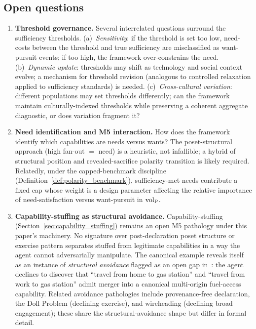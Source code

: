\subsection{Open questions}

\begin{enumerate}

\item \label{oq:threshold_governance}
\textbf{Threshold governance.}
Several interrelated questions surround the sufficiency
thresholds.  (a)~\emph{Sensitivity}: if the threshold is set
too low, need-costs between the threshold and true sufficiency
are misclassified as want-pursuit events; if too high, the
framework over-constrains the need.
(b)~\emph{Dynamic update}: thresholds may shift as technology
and social context evolve; a mechanism for threshold revision
(analogous to controlled relaxation applied to sufficiency
standards) is needed.
(c)~\emph{Cross-cultural variation}: different populations may
set thresholds differently; can the framework maintain
culturally-indexed thresholds while preserving a coherent
aggregate diagnostic, or does variation fragment it?

\item \label{oq:need_identification}
\textbf{Need identification and M5 interaction.}
How does the framework identify which capabilities are needs
versus wants?  The poset-structural approach (high fan-out $=$
need) is a heuristic, not infallible; a hybrid of structural
position and revealed-sacrifice polarity transition is likely
required.  Relatedly, under the capped-benchmark discipline
(Definition~\ref{def:polarity_benchmark}), sufficiency-met
needs contribute a fixed cap whose weight is a design
parameter affecting the relative importance of
need-satisfaction versus want-pursuit in ${\operatorname{vol}_{\mathrm{P}}}$.

\item \label{oq:capability_stuffing}
\textbf{Capability-stuffing as structural avoidance.}
Capability-stuffing (Section~\ref{sec:capability_stuffing})
remains an open M5 pathology under this paper's machinery.  No
signature over post-declaration poset structure or exercise
pattern separates stuffed from legitimate capabilities in a way
the agent cannot adversarially manipulate.  The canonical
example reveals itself as an instance of
\emph{structural avoidance} flagged as an open gap
in~\citep[Discussion]{lasser2026poset}: the agent declines to
discover that ``travel from home to gas station'' and ``travel
from work to gas station'' admit merger into a canonical
multi-origin fuel-access capability.  Related avoidance
pathologies include provenance-free declaration, the Doll
Problem (declining exercise), and wireheading (declining broad
engagement); these share the structural-avoidance shape but
differ in formal detail.


\end{enumerate}
